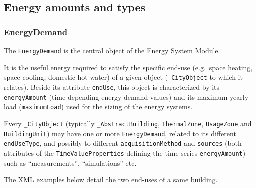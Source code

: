 \documentclass[a4paper,12pt]{article}
\begin{document}
\subsection{Energy amounts and types}\label{energy-amounts-and-types}

\subsubsection{EnergyDemand}\label{energydemand}

The \lstinline!EnergyDemand! is the central object of the Energy System
Module.

It is the useful energy required to satisfy the specific end-use
(e.g.~space heating, space cooling, domestic hot water) of a given
object (\lstinline!_CityObject! to which it relates). Beside its
attribute \lstinline!endUse!, this object is characterized by its
\lstinline!energyAmount! (time-depending energy demand values) and its
maximum yearly load (\lstinline!maximumLoad!) used for the sizing of the
energy systems.

Every \lstinline!_CityObject! (typically \lstinline!_AbstractBuilding!,
\lstinline!ThermalZone!, \lstinline!UsageZone! and
\lstinline!BuildingUnit!) may have one or more \lstinline!EnergyDemand!,
related to its different \lstinline!endUseType!, and possibly to
different \lstinline!acquisitionMethod! and \lstinline!sources! (both
attributes of the \lstinline!TimeValueProperties! defining the time
series \lstinline!energyAmount!) such as ``measurements'',
``simulations'' etc.

The XML examples below detail the two end-uses of a same building.
\end{document}

